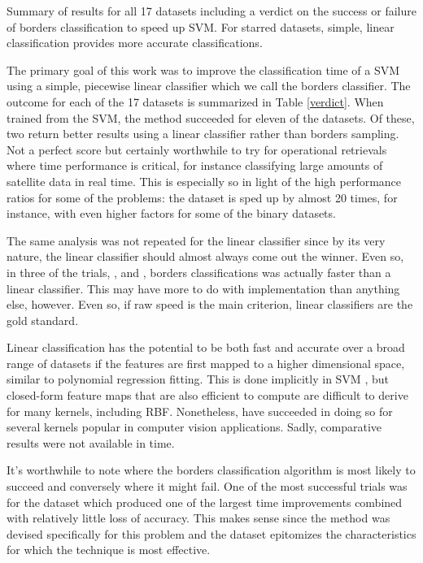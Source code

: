 \label{conclusion}

\begin{table}
	\caption{Summary of results for all 17 datasets including a verdict on the success or failure of borders classification to speed up SVM. For starred datasets, simple, linear classification provides more accurate classifications.}
	\label{verdict}
	
	\vspace{1 ex}
\end{table}

The primary goal of this work was to improve the classification time of a SVM
using a simple, piecewise linear classifier which we call the borders classifier.
The outcome for each of the 17 datasets is summarized in Table \ref{verdict}.
When trained from the SVM, the method succeeded for eleven of the datasets.
Of these, two return better results using a linear classifier rather than
borders sampling.
Not a perfect score but certainly worthwhile to try for operational retrievals
where time performance is critical, 
for instance classifying large amounts of satellite data in real time.
This is especially so in light of the high performance ratios for some of the problems:
the  dataset is sped up by almost 20 times,
for instance, with even higher factors for some of the binary datasets.

The same analysis was not repeated for the linear classifier since by its very 
nature, the linear classifier should almost always come out the winner.
Even so, in three of the trials, ,  and
, borders classifications was actually faster than a linear
classifier. This may have more to do with implementation than anything else,
however. Even so, if raw speed is the main criterion, linear classifiers are
the gold standard. 

Linear classification has the potential to be both fast
and accurate over a broad range of datasets if the features are first mapped
to a higher dimensional space, similar to polynomial regression fitting.
This is done implicitly in SVM \citep{Mueller_etal2001}, but closed-form
feature maps that are also efficient to compute
are difficult to derive for many kernels, including RBF. 
Nonetheless, \citet{Vedaldi_Zisserman2012} have succeeded in doing so for
several kernels popular in computer vision applications.
Sadly, comparative results were not available in time.

It's worthwhile to note where the borders classification algorithm 
is most likely to succeed and conversely where it might fail.
One of the most successful trials was for the  dataset which produced one of
the largest time improvements combined with relatively little loss of accuracy.
This makes sense since the method was devised specifically for this problem and
the  dataset epitomizes the characteristics for which the technique is most
effective.

